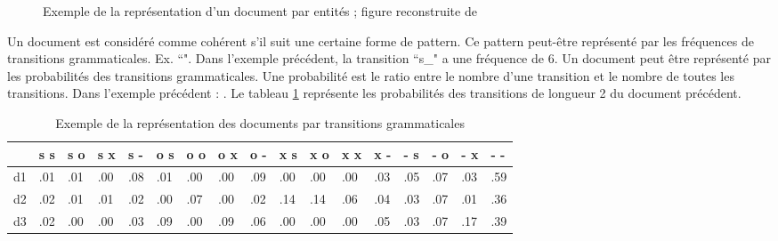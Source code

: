 \documentclass{KodeBook}
\begin{document}
\begin{figure}[ht]
\begin{tabular}{ccccccccccccccccc}
	\end{tabular}
	
	\caption[Exemple de la représentation d'un document par entités]{Exemple de la représentation d'un document par entités ; figure reconstruite de \cite{2008-barzilay-lapata}}
	\label{fig:entity-grid-rep}
\end{figure}

%	

Un document est considéré comme cohérent s'il suit une certaine forme de pattern.
Ce pattern peut-être représenté par les fréquences de transitions grammaticales. Ex. ``".
Dans l'exemple précédent, la transition ``s\_" a une fréquence de 6.
Un document peut être représenté par les probabilités des transitions grammaticales.
Une probabilité est le ratio entre le nombre d'une transition et le nombre de toutes les transitions.
Dans l'exemple précédent : .
Le tableau \ref{tab:entity-grid-prob} représente les probabilités des transitions de longueur 2 du document précédent.

\begin{table}[ht]
	\centering
	\begin{tabular}{lllllllllllllllll}
		\hline
		& s s & s o & s x & s - & o s & o o & o x & o - & x s & x o & x x & x - & - s & - o & - x & - - \\
		\hline
		d1 & .01 & .01 & .00 & .08 & .01 & .00 & .00 & .09 & .00 & .00 & .00 & .03 & .05 & .07 & .03 & .59 \\
		d2 & .02 & .01 & .01 & .02 & .00 & .07 & .00 & .02 & .14 & .14 & .06 & .04 & .03 & .07 & .01 & .36 \\
		d3 & .02 & .00 & .00 & .03 & .09 & .00 & .09 & .06 & .00 & .00 & .00 & .05 & .03 & .07 & .17 & .39 \\
		\hline
	\end{tabular}
	\caption[Exemple de la représentation des documents par transitions grammaticales]{Exemple de la représentation des documents par transitions grammaticales \cite{2008-barzilay-lapata}}
	\label{tab:entity-grid-prob}
\end{table}
\end{document}
